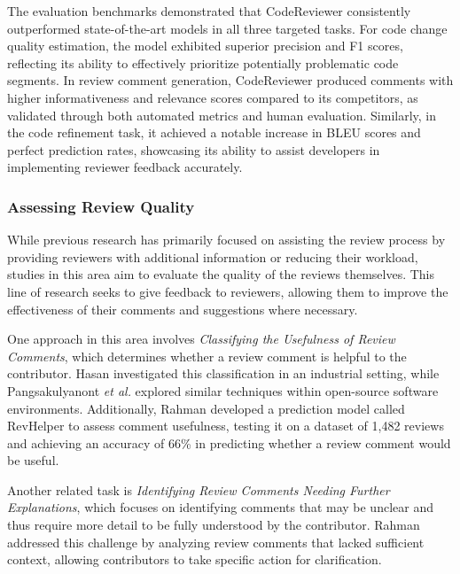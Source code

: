The evaluation benchmarks demonstrated that CodeReviewer consistently
outperformed state-of-the-art models in all three targeted tasks. For code
change quality estimation, the model exhibited superior precision and F1
scores, reflecting its ability to effectively prioritize potentially
problematic code segments. In review comment generation, CodeReviewer produced
comments with higher informativeness and relevance scores compared to its
competitors, as validated through both automated metrics and human evaluation.
Similarly, in the code refinement task, it achieved a notable increase in BLEU
scores and perfect prediction rates, showcasing its ability to assist
developers in implementing reviewer feedback accurately.

\subsubsection{Assessing Review Quality}

While previous research has primarily focused on assisting the review process
by providing reviewers with additional information or reducing their workload,
studies in this area aim to evaluate the quality of the reviews themselves.
This line of research seeks to give feedback to reviewers, allowing them to
improve the effectiveness of their comments and suggestions where necessary.

One approach in this area involves \textit{Classifying the Usefulness of Review
    Comments}, which determines whether a review comment is helpful to the
contributor. Hasan \etal \cite{hasan:emse2021} investigated this classification
in an industrial setting, while Pangsakulyanont \textit{et
    al.}\cite{pangsakulyanont:iwesep2014} explored similar techniques within
open-source software environments. Additionally, Rahman \etal
\cite{rahman:msr2017} developed a prediction model called RevHelper to assess
comment usefulness, testing it on a dataset of 1,482 reviews and achieving an
accuracy of 66\% in predicting whether a review comment would be useful.

Another related task is \textit{Identifying Review Comments Needing Further
    Explanations}, which focuses on identifying comments that may be unclear and
thus require more detail to be fully understood by the contributor. Rahman
\etal \cite{rahman:esem2022} addressed this challenge by analyzing review
comments that lacked sufficient context, allowing contributors to take specific
action for clarification.

